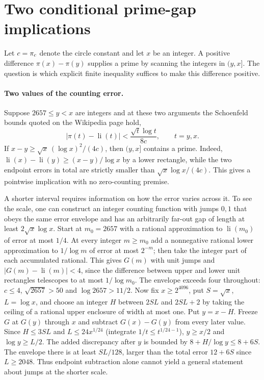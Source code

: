 \section{Two conditional prime-gap implications}
\label{sec:conditional-gap}
Let $c=\pi_{\rm c}$ denote the circle constant and let $x$ be an integer. A positive difference $\pi(x)-\pi(y)$ supplies a prime by scanning the integers in $(y,x]$. The question is which explicit finite inequality suffices to make this difference positive.

\paragraph{Two values of the counting error.}
Suppose $2657\le y<x$ are integers and at these two arguments the Schoenfeld bounds quoted on the Wikipedia page hold,
\[
 |\pi(t)-\operatorname{li}(t)|<\frac{\sqrt t\log t}{8c},\qquad t=y,x .
\]
If $x-y\ge\sqrt x\,(\log x)^2/(4c)$, then $(y,x]$ contains a prime. Indeed, $\operatorname{li}(x)-\operatorname{li}(y)\ge(x-y)/\log x$ by a lower rectangle, while the two endpoint errors in total are strictly smaller than $\sqrt{x}\log x/(4c)$. This gives a pointwise implication with no zero-counting premise.

A shorter interval requires information on how the error varies across it. To see the scale, one can construct an integer counting function with jumps $0,1$ that obeys the same error envelope and has an arbitrarily far-out gap of length at least $2\sqrt{x}\log x$. Start at $m_0=2657$ with a rational approximation to $\operatorname{li}(m_0)$ of error at most $1/4$. At every integer $m\ge m_0$ add a nonnegative rational lower approximation to $1/\log m$ of error at most $2^{-m}$; then take the integer part of each accumulated rational. This gives $G(m)$ with unit jumps and $|G(m)-\operatorname{li}(m)|<4$, since the difference between upper and lower unit rectangles telescopes to at most $1/\log m_0$. The envelope exceeds four throughout: $c\le4$, $\sqrt{2657}>50$ and $\log2657>11/2$. Now fix $x\ge2^{4096}$, put $S=\sqrt x$, $L=\log x$, and choose an integer $H$ between $2SL$ and $2SL+2$ by taking the ceiling of a rational upper enclosure of width at most one. Put $y=x-H$. Freeze $G$ at $G(y)$ through $x$ and subtract $G(x)-G(y)$ from every later value. Since $H\le3SL$ and $L\le 24x^{1/24}$ (integrate $1/t\le t^{1/24-1}$), $y\ge x/2$ and $\log y\ge L/2$. The added discrepancy after $y$ is bounded by $8+H/\log y\le 8+6S$. The envelope there is at least $SL/128$, larger than the total error $12+6S$ since $L\ge2048$. Thus endpoint subtraction alone cannot yield a general statement about jumps at the shorter scale.

